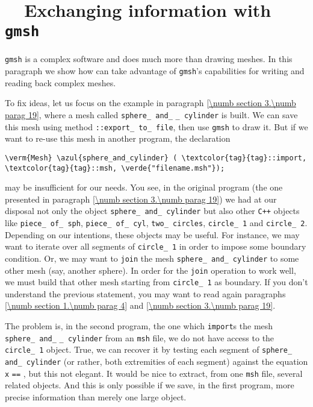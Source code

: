 \section{~~Exchanging information with {\tt gmsh}}\label{\numb section 8.\numb parag 3}

{\small\tt gmsh} is a complex software and does much more than drawing meshes.
In this paragraph we show how {\maniFEM} can take advantage of {\small\tt gmsh}'s capabilities
for writing and reading back complex meshes.

To fix ideas, let us focus on the example in paragraph \ref{\numb section 3.\numb parag 19},
where a mesh called {\small\tt sphere\_\,and\_} {\small\tt\_\,cylinder} is built.
We can save this mesh using method {\small\tt{}::export\_\,to\_\,file}, then use
{\small\tt gmsh} to draw it.
But if we want to re-use this mesh in another {\maniFEM} program, the declaration

\begin{Verbatim}[commandchars=\\\{\},formatcom=\small\tt,
   baselinestretch=0.94,framesep=2mm                     ]
   \verm{Mesh} \azul{sphere_and_cylinder} ( \textcolor{tag}{tag}::import, \textcolor{tag}{tag}::msh, \verde{"filename.msh"});
\end{Verbatim}

\noindent may be insufficient for our needs.
You see, in the original program (the one presented in paragraph
\ref{\numb section 3.\numb parag 19}) we had at our disposal not only the {\small\tt{}}
object {\small\tt sphere\_\,and\_\,cylinder} but also other {\tt C++} objects like
{\small\tt piece\_\,of\_\,sph}, {\small\tt piece\_\,of\_\,cyl}, {\small\tt two\_\,circles},
{\small\tt circle\_\,1} and {\small\tt circle\_\,2}.
Depending on our intentions, these objects may be useful.
For instance, we may want to iterate over all segments of {\small\tt circle\_\,1} in order to
impose some boundary condition.
Or, we may want to {\small\tt join} the mesh {\small\tt sphere\_\,and\_\,cylinder} to some
other mesh (say, another sphere).
In order for the {\small\tt join} operation to work well, we must build that other
mesh starting from {\small\tt circle\_\,1} as boundary.
If you don't understand the previous statement, you may want to read again paragraphs
\ref{\numb section 1.\numb parag 4} and \ref{\numb section 3.\numb parag 19}.

The problem is, in the second {\maniFEM} program, the one which {\small\tt import}s the mesh
{\small\tt sphere\_\,and\_} {\small\tt\_\,cylinder} from an {\small\tt msh} file,
we do not have access to the {\small\tt circle\_\,1} object.
True, we can recover it by testing each segment of {\small\tt sphere\_\,and\_\,cylinder}
(or rather, both extremities of each segment) against the equation {\small\tt x} {\small\tt ==}
{\small\tt{}}, but this not elegant.
It would be nice to extract, from one {\small\tt msh} file, several related
{\small\tt{}} objects.
And this is only possible if we save, in the first {\maniFEM} program, more precise information
than merely one large {\small\tt{}} object.

